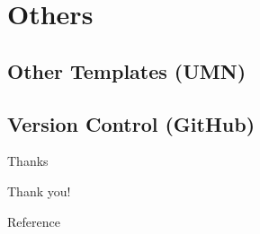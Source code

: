 \documentclass[11pt]{beamer}
\begin{document}
\section{Others}
    \subsection{Other Templates (UMN)}
    \subsection{Version Control (GitHub)}




\begin{frame}{Thanks}


    \Huge{\centerline{Thank you!}}
\end{frame}


\begin{frame}[allowframebreaks]{Reference}


\end{frame}
\end{document}
